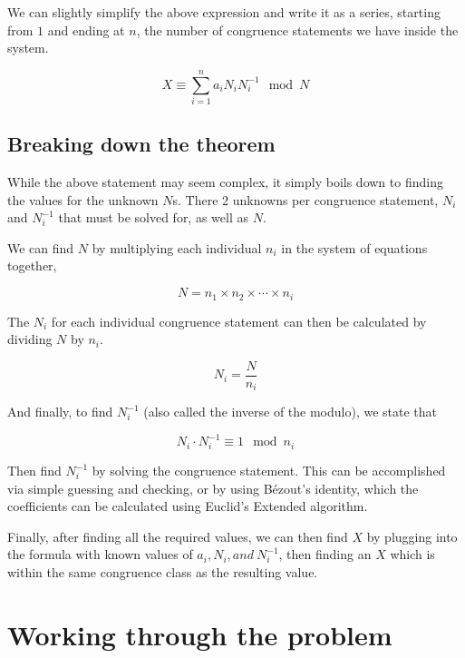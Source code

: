\documentclass[index]{subfiles}
\begin{document}
We can slightly simplify the above expression and write it as a series, starting from \(1\) and ending at \(n\), the number of congruence statements we have inside the system.

\begin{equation*}
    X\equiv \sum_{i=1}^{n}a_{i}N_{i}N_{i}^{-1}\mod N
\end{equation*}

\subsection{Breaking down the theorem}

While the above statement may seem complex, it simply boils down to finding the values for the unknown \(N\)s. There 2 unknowns per congruence statement, \(N_i\) and \(N_i^{-1}\) that must be solved for, as well as \(N\).

We can find \(N\) by multiplying each individual \(n_i\) in the system of equations together,

\begin{equation*}
    N=n_1\times n_2 \times \cdots \times n_i
\end{equation*}

The \(N_i\) for each individual congruence statement can then be calculated by dividing \(N\) by \(n_i\).

\begin{equation*}
    N_i=\frac{N}{n_i}
\end{equation*}

And finally, to find \(N_i^{-1}\) (also called the inverse of the modulo), we state that

\begin{equation*}
    N_i\cdot N_i^{-1}\equiv 1 \mod n_i
\end{equation*}

Then find \(N_i^{-1}\) by solving the congruence statement. This can be accomplished via simple guessing and checking, or by using Bézout's identity, which the coefficients can be calculated using Euclid's Extended algorithm.

Finally, after finding all the required values, we can then find \(X\) by plugging into the formula with known values of \(a_{i}, N_{i}, and\ N_{i}^{-1}\), then finding an \(X\) which is within the same congruence class as the resulting value.

\section{Working through the problem}
\end{document}
